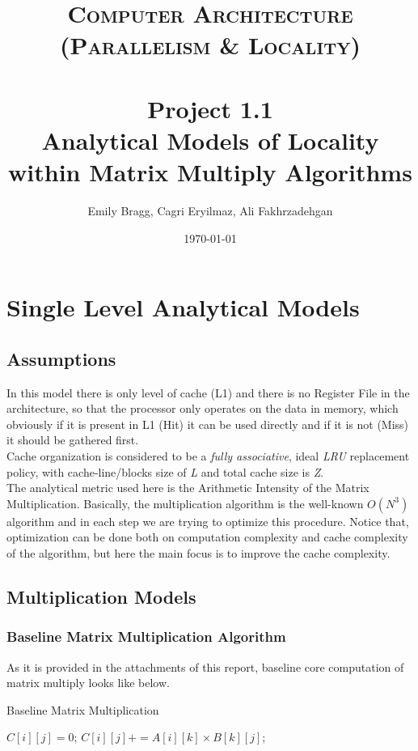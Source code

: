 \documentclass[paper=a4, fontsize=11pt]{scrartcl} %
\title{	
\normalfont \normalsize 
\textsc{Computer Architecture (Parallelism \& Locality) } \\ [25pt] %
\horrule{0.5pt} \\[0.4cm] %
\huge Project 1.1 \\ %
\huge Analytical Models of Locality within Matrix Multiply Algorithms
\horrule{2pt} \\[0.5cm] %
}
\author{Emily Bragg, Cagri Eryilmaz, Ali Fakhrzadehgan} %
\date{\normalsize\today} %
\numberwithin{equation}{section} %
\numberwithin{figure}{section} %
\numberwithin{table}{section} %
\begin{document}
\maketitle %

\newpage


\section{Single Level Analytical Models}
\subsection{Assumptions}
In this model there is only level of cache (L1) and there is no Register File in the architecture, so that the processor only operates on the data in memory, which obviously if it is present in L1 (Hit) it can be used directly and if it is not (Miss) it should be gathered first.\\
Cache organization is considered to be a \textit{fully associative}, ideal \textit{LRU} replacement policy, with cache-line/blocks size of \textit{L} and total cache size is \textit{Z}.\\
The analytical metric used here is the Arithmetic Intensity of the Matrix Multiplication. Basically, the multiplication algorithm is the well-known $O(N^{3})$ algorithm and in each step we are trying to optimize this procedure. Notice that, optimization can be done both on computation complexity and cache complexity of the algorithm, but here the main focus is to improve the cache complexity. 

\subsection{Multiplication Models}

\subsubsection{Baseline Matrix Multiplication Algorithm}
As it is provided in the attachments of this report, baseline core computation of matrix multiply looks like below.\\

\begin{algorithm}
\caption{Baseline Matrix Multiplication}
\label{Base-Alg}
\begin{algorithmic}
		\State $C[ i ][ j ] = 0$;
		\State $C[ i ][ j ] += A[ i ][ k ] \times B[ k ][ j ]$; 
		\EndFor
	\EndFor
\EndFor
\end{algorithmic}
\end{algorithm}
\end{document}
